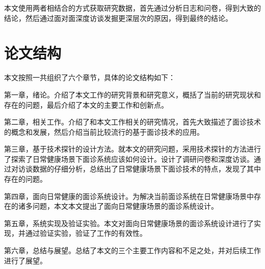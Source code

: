 本文使用两者相结合的方式获取研究数据，首先通过分析日志和问卷，得到大致的结论，然后通过面对面深度访谈发掘更深层次的原因，得到最终的结论。



\section{论文结构}
本文按照一共组织了六个章节，具体的论文结构如下：

第一章，绪论。介绍了本文工作的研究背景和研究意义，概括了当前的研究现状和存在的问题，最后介绍了本文的主要工作和创新点。

第二章，相关工作。介绍了和本文工作相关的研究情况，首先大致描述了面诊技术的概念和发展，然后介绍当前比较流行的基于面诊技术的应用。

第三章，基于技术探针的设计方法。就本文的研究问题，采用技术探针的方法进行了探索了日常健康场景下面诊系统应该如何设计。设计了调研问卷和深度访谈。通过对访谈数据的仔细分析，总结出了日常健康场景下面诊技术的特点，发现了其中存在的问题。

第四章，面向日常健康的面诊系统设计。为解决当前面诊系统在日常健康场景中存在的诸多问题，本文本文提出了面向日常健康场景的面诊系统设计。

第五章，系统实现及验证实验。本文对面向日常健康场景的面诊系统设计进行了实现，并通过验证实验，验证了工作的有效性。

第六章，总结与展望。总结了本文的三个主要工作内容和不足之处，并对后续工作进行了展望。